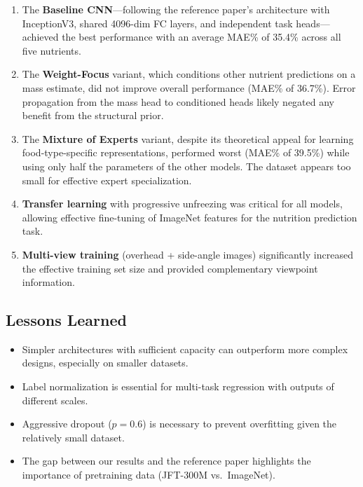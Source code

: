 \documentclass[11pt,a4paper]{article}
\begin{document}
\begin{enumerate}
  \item The \textbf{Baseline CNN}---following the reference paper's architecture with InceptionV3, shared 4096-dim FC layers, and independent task heads---achieved the best performance with an average MAE\% of 35.4\% across all five nutrients.

  \item The \textbf{Weight-Focus} variant, which conditions other nutrient predictions on a mass estimate, did not improve overall performance (MAE\% of 36.7\%). Error propagation from the mass head to conditioned heads likely negated any benefit from the structural prior.

  \item The \textbf{Mixture of Experts} variant, despite its theoretical appeal for learning food-type-specific representations, performed worst (MAE\% of 39.5\%) while using only half the parameters of the other models. The dataset appears too small for effective expert specialization.

  \item \textbf{Transfer learning} with progressive unfreezing was critical for all models, allowing effective fine-tuning of ImageNet features for the nutrition prediction task.

  \item \textbf{Multi-view training} (overhead + side-angle images) significantly increased the effective training set size and provided complementary viewpoint information.
\end{enumerate}

\subsection{Lessons Learned}

\begin{itemize}
  \item Simpler architectures with sufficient capacity can outperform more complex designs, especially on smaller datasets.
  \item Label normalization is essential for multi-task regression with outputs of different scales.
  \item Aggressive dropout ($p = 0.6$) is necessary to prevent overfitting given the relatively small dataset.
  \item The gap between our results and the reference paper highlights the importance of pretraining data (JFT-300M vs.\ ImageNet).
\end{itemize}
\end{document}
